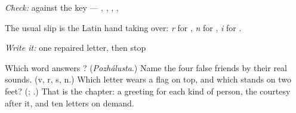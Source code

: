\emph{Check:} against the key — \textbf{    }, \textbf{ }, \textbf{  }, \textbf{}, \textbf{}

The usual slip is the Latin hand taking over: \emph{r} for \textbf{}, \emph{n} for \textbf{}, \emph{i} for \textbf{}.

\emph{Write it:} one repaired letter, then stop

\begin{tcolorbox}[breakable,colback=teal!4,colframe=teal!35!black,title={Before you move on}]
Which word answers \textbf{}? (\emph{Pozhálusta}.) Name the four false friends by their real sounds. (v, r, s, n.) Which letter wears a flag on top, and which stands on two feet? (\textbf{}; \textbf{}.) That is the chapter: a greeting for each kind of person, the courtesy after it, and ten letters on demand.
\end{tcolorbox}

